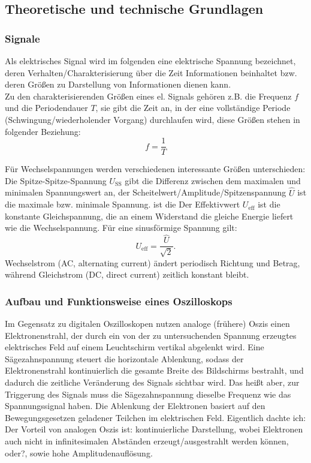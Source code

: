 \newpage

\subsection[Theoretische und technische Grundlagen]{Theoretische und technische Grundlagen \autocite{Skript_1}}
\subsubsection{Signale}
Als elektrisches Signal wird im folgenden eine elektrische Spannung bezeichnet, deren Verhalten/Charakterisierung über die Zeit Informationen beinhaltet bzw. deren Größen zu Darstellung von Informationen dienen kann.\\
Zu den charakterisierenden Größen eines el. Signals gehören z.B. die Frequenz \(f\) und die Periodendauer \(T\), sie gibt die Zeit an, in der eine vollständige Periode (Schwingung/wiederholender Vorgang) durchlaufen wird, diese Größen stehen in folgender Beziehung:
\begin{equation}
f = \frac{1}{T}
\label{eq:freq}
\end{equation}

Für Wechselspannungen werden verschiedenen interessante Größen unterschieden: Die Spitze-Spitze-Spannung \(U_\text{SS}\) gibt die Differenz zwischen dem maximalen und minimalen Spannungswert an, der Scheitelwert/Amplitude/Spitzenspannung \(\hat{U}\) ist die maximale bzw. minimale Spannung. ist die Der Effektivwert \(U_\text{eff}\) ist die konstante Gleichspannung, die an einem Widerstand die gleiche Energie liefert wie die Wechselspannung. Für eine sinusförmige Spannung gilt:
\begin{equation}
U_\text{eff} = \frac{\hat{U}}{\sqrt{2}}.
\end{equation}
Wechselstrom (AC, alternating current) ändert periodisch Richtung und Betrag, während Gleichstrom (DC, direct current) zeitlich konstant bleibt.  

\subsubsection{Aufbau und Funktionsweise eines Oszilloskops}
Im Gegensatz zu digitalen Oszilloskopen nutzen analoge (frühere) Oszis einen Elektronenstrahl, der durch ein von der zu untersuchenden Spannung erzeugtes elektrisches Feld auf einem Leuchtschirm vertikal abgelenkt wird. Eine Sägezahnspannung steuert die horizontale Ablenkung, sodass der Elektronenstrahl kontinuierlich die gesamte Breite des Bildschirms bestrahlt, und dadurch die zeitliche Veränderung des Signals sichtbar wird. Das heißt aber, zur Triggerung des Signals muss die Sägezahnspannung dieselbe Frequenz wie das Spannungssignal haben. Die Ablenkung der Elektronen basiert auf den Bewegungsgesetzen geladener Teilchen im elektrischen Feld. Eigentlich dachte ich: Der Vorteil von analogen Oszis ist: kontinuierliche Darstellung, wobei Elektronen auch nicht in infinitesimalen Abständen erzeugt/ausgestrahlt werden können, oder?, sowie hohe Amplitudenauflösung.

